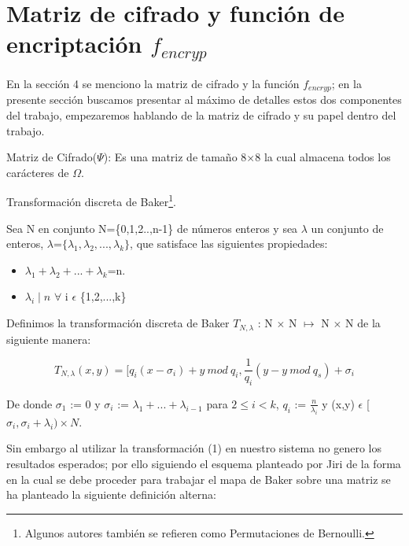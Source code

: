\section{Matriz de cifrado y funci\'on de encriptaci\'on $f_{encryp}$}

En la secci\'on 4 se menciono la matriz de cifrado y la funci\'on $f_{encryp}$; en la presente secci\'on buscamos presentar al m\'aximo de detalles estos dos componentes del trabajo, empezaremos hablando de la matriz de cifrado y su papel dentro del trabajo.

\begin{defi} Matriz de Cifrado($\Psi$): 
	Es una matriz de tama\~no 8$\times$8 la cual almacena todos los car\'acteres de $\Omega$.
\end{defi}

\begin{defi} Transformaci\'on discreta de Baker\footnote{Algunos autores tambi\'en se refieren como Permutaciones de Bernoulli.}.

Sea N en conjunto N=\{0,1,2..,n-1\} de n\'umeros enteros y sea $\lambda$ un conjunto de enteros, $\lambda$=$\{\lambda_{1}, \lambda_{2},...,\lambda_{k}\}$, que satisface las siguientes propiedades:

\begin{itemize}
	\item $\lambda_{1}+\lambda_{2}+...+\lambda_{k}$=n.
	\item $\lambda_{i}\mid n$ $\forall$ i $\epsilon$ \{1,2,...,k\}
\end{itemize}

Definimos la transformaci\'on discreta de Baker $T_{N,\lambda}$ : N $\times$ N $\longmapsto$ N $\times$ N de la siguiente manera:

\begin{equation}
  T_{N,\lambda}(x,y) = [q_{i}(x-\sigma_{i}) + y \ mod \ q_{i} , \frac{1}{q_{i}}(y - y \ mod \ q_{s} ) + \sigma_{i}
\end{equation}

De donde $\sigma_{1}$ := 0 y $\sigma_{i}$ := $\lambda_{1}+...+\lambda_{i-1}$ para $2 \leq i < k$, $q_{i}$ := $\frac{n}{\lambda_{i}}$ y (x,y) $\epsilon$ [$\sigma_{i},\sigma_{i}+\lambda_{i})\times N $.

\end{defi}

Sin embargo al utilizar la transformaci\'on (1) en nuestro sistema no genero los resultados esperados; por ello siguiendo el esquema planteado por Jiri \cite{Jiri} de la forma en la cual se debe proceder para trabajar el mapa de Baker sobre una matriz se ha planteado la siguiente definici\'on alterna:

